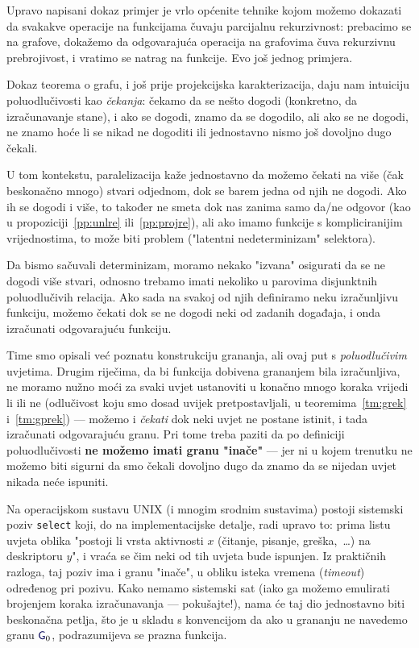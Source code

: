 Upravo napisani dokaz primjer je vrlo općenite tehnike kojom možemo dokazati da svakakve operacije na funkcijama čuvaju parcijalnu rekurzivnost: prebacimo se na grafove, dokažemo da odgovarajuća operacija na grafovima čuva rekurzivnu prebrojivost, i vratimo se natrag na funkcije. Evo još jednog primjera.


Dokaz teorema o grafu, i još prije projekcijska karakterizacija, daju nam intuiciju poluodlučivosti kao \emph{čekanja}: čekamo da se nešto dogodi (konkretno, da izračunavanje stane), i ako se dogodi, znamo da se dogodilo, ali ako se ne dogodi, ne znamo hoće li se nikad ne dogoditi ili jednostavno nismo još dovoljno dugo čekali.

U tom kontekstu, paralelizacija kaže jednostavno da možemo čekati na više (čak beskonačno mnogo) stvari odjednom, dok se barem jedna od njih ne dogodi. Ako ih se dogodi i više, to također ne smeta dok nas zanima samo da\slash ne odgovor (kao u propoziciji~\ref{pp:unlre} ili~\ref{pp:projre}), ali ako imamo funkcije s kompliciranijim vrijednostima, to može biti problem ("latentni nedeterminizam" selektora). 

Da bismo sačuvali determinizam, moramo nekako "izvana" osigurati da se ne dogodi više stvari, odnosno trebamo imati nekoliko u parovima disjunktnih poluodlučivih relacija. Ako sada na svakoj od njih definiramo neku izračunljivu funkciju, možemo čekati dok se ne dogodi neki od zadanih događaja, i onda izračunati odgovarajuću funkciju.

Time smo opisali već poznatu konstrukciju grananja, ali ovaj put s \emph{poluodlučivim} uvjetima. Drugim riječima, da bi funkcija dobivena grananjem bila izračunljiva, ne moramo nužno moći za svaki uvjet ustanoviti u konačno mnogo koraka vrijedi li ili ne (odlučivost koju smo dosad uvijek pretpostavljali, u teoremima~\ref{tm:grek} i~\ref{tm:gprek}) --- možemo i \emph{čekati} dok neki uvjet ne postane istinit, i tada izračunati odgovarajuću granu. Pri tome treba paziti da po definiciji poluodlučivosti \textbf{ne možemo imati granu "inače"} --- jer ni u kojem trenutku ne možemo biti sigurni da smo čekali dovoljno dugo da znamo da se nijedan uvjet nikada neće ispuniti.

Na operacijskom sustavu UNIX (i mnogim srodnim sustavima) postoji sistemski poziv \texttt{select} koji, do na implementacijske detalje, radi upravo to: prima listu uvjeta oblika "postoji li vrsta aktivnosti $x$ (čitanje, pisanje, greška,~\ldots) na deskriptoru $y$", i vraća se čim neki od tih uvjeta bude ispunjen. Iz praktičnih razloga, taj poziv ima i granu "inače", u obliku isteka vremena (\emph{timeout}) određenog pri pozivu. Kako nemamo sistemski sat (iako ga možemo emulirati brojenjem koraka izračunavanja --- pokušajte!), nama će taj dio jednostavno biti beskonačna petlja, što je u skladu s konvencijom da ako u grananju ne navedemo granu $\f G_0$, podrazumijeva se prazna funkcija.


